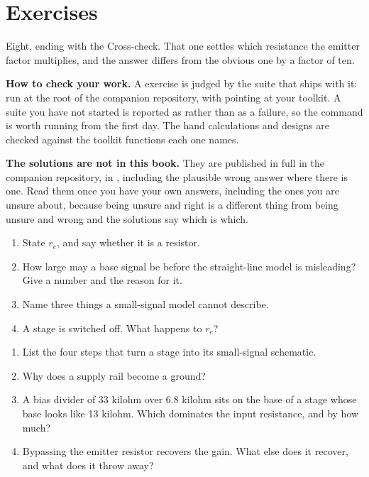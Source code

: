 
\section{Exercises}
\label{c7:sec:exercises}

Eight, ending with the Cross-check. That one settles which resistance the emitter factor multiplies, and the answer differs from the obvious one by a factor of ten.

\begin{aside}
\textbf{How to check your work.} A  exercise is judged by the suite that ships with it: run  at the root of the companion repository, with  pointing at your toolkit. A suite you have not started is reported as  rather than as a failure, so the command is worth running from the first day. The hand calculations and designs are checked against the toolkit functions each one names.

\textbf{The solutions are not in this book.} They are published in full in the companion repository, in , including the plausible wrong answer where there is one. Read them once you have your own answers, including the ones you are unsure about, because being unsure and right is a different thing from being unsure and wrong and the solutions say which is which.
\end{aside}

\label{c7:ex:1}
\begin{enumerate}
  \item State $r_e$, and say whether it is a resistor.
  \item How large may a base signal be before the straight-line model is misleading? Give a number and the reason for it.
  \item Name three things a small-signal model cannot describe.
  \item A stage is switched off. What happens to $r_e$?
\end{enumerate}

\label{c7:ex:2}
\begin{enumerate}
  \item List the four steps that turn a stage into its small-signal schematic.
  \item Why does a supply rail become a ground?
  \item A bias divider of 33 kilohm over 6.8 kilohm sits on the base of a stage whose base looks like 13 kilohm. Which dominates the input resistance, and by how much?
  \item Bypassing the emitter resistor recovers the gain. What else does it recover, and what does it throw away?
\end{enumerate}


